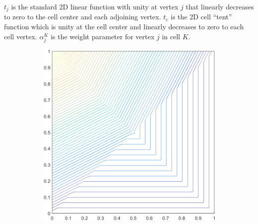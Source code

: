 \noindent $t_j$ is the standard 2D linear function with unity at vertex $j$ that linearly decreases to zero to the cell center and each adjoining vertex. $t_c$ is the 2D cell ``tent'' function which is unity at the cell center and linearly decreases to zero to each cell vertex. $\alpha_{j}^{K}$ is the weight parameter for vertex $j$ in cell $K$. 


\begin{figure}
\label{fig::2D_PWLD1_unit_square_basis_functions}
\centering
	\begin{subfigure}[b]{0.39\textwidth}
		\centering
		\includegraphics[width=\textwidth]{figures/sec_BF/square_PWLD1_contour_b4.png}
		\caption{}
	\end{subfigure}
	\hspace{1.5cm}
	\begin{subfigure}[b]{0.39\textwidth}
		\centering

\end{subfigure}
\end{figure}
